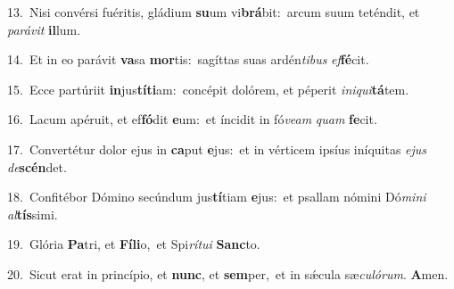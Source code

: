 {\numbfont\textcolor{\numbcolor}{13.}}~Nisi convérsi fuéritis, gládium \textbf{su}\-um vi\-\textbf{brá}\-bit:~\star arcum suum teténdit, et \textit{pa}\-\textit{rá}\textit{vit} \textbf{il}\-lum.\par
{\numbfont\textcolor{\numbcolor}{14.}}~Et in eo parávit \textbf{va}\-sa \textbf{mor}\-tis:~\star sagíttas suas ardén\-\textit{ti}\-\textit{bus} \textit{ef}\-\textbf{fé}cit.\par
{\numbfont\textcolor{\numbcolor}{15.}}~Ecce partúriit \textbf{in}\-jus\-\textbf{tí}\-\textbf{ti}am:~\star concépit dolórem, et péperit \textit{in}\-\textit{i}\textit{qui}\textbf{tá}tem.\par
{\numbfont\textcolor{\numbcolor}{16.}}~Lacum apéruit, et ef\-\textbf{fó}\-dit \textbf{e}\-um:~\star et íncidit in fó\-\textit{ve}\-\textit{am} \textit{quam} \textbf{fe}\-cit.\par
{\numbfont\textcolor{\numbcolor}{17.}}~Convertétur dolor ejus in \textbf{ca}\-put \textbf{e}\-jus:~\star et in vérticem ipsíus iníquitas \textit{e}\-\textit{jus} \textit{de}\-\textbf{scén}det.\par
{\numbfont\textcolor{\numbcolor}{18.}}~Confitébor Dómino secúndum jus\-\textbf{tí}\-tiam \textbf{e}\-jus:~\star et psallam nómini Dó\-\textit{mi}\-\textit{ni} \textit{al}\-\textbf{tís}simi.\par
{\numbfont\textcolor{\numbcolor}{19.}}~Glória \textbf{Pa}\-tri, et \textbf{Fí}\-\textbf{li}o,~\star et Spi\-\textit{rí}\-\textit{tu}\textit{i} \textbf{Sanc}\-to.\par
{\numbfont\textcolor{\numbcolor}{20.}}~Sicut erat in princípio, et \textbf{nunc}\-, et \textbf{sem}\-per,~\star et in sǽcula sæ\-\textit{cu}\-\textit{ló}\textit{rum}. \textbf{A}\-men.\par
